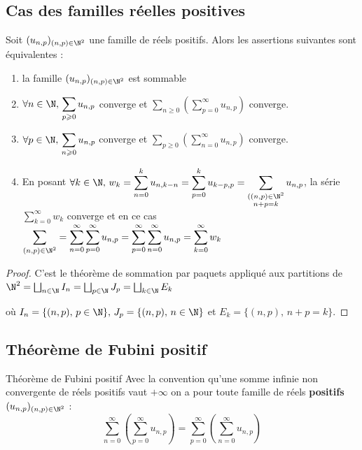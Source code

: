 \subsection{Cas des familles réelles positives}

\begin{theoreme}{}{}
    Soit $(u_{n, p})_{(n, p) \in \N^2}$ une famille de réels positifs.
    Alors les assertions suivantes sont équivalentes :
    \begin{enumerate}
        \item la famille $(u_{n, p})_{(n, p) \in \N^2}$ est sommable
        \item $\displaystyle \forall n \in \N, \, \sum_{p \geqslant 0 } u_{n, p}$ converge et $\displaystyle \sum_{n \geqslant 0} \left( \sum_{p = 0}^\infty u_{n, p} \right)$ converge.
        \item $\forall p \in \N, \, \displaystyle \sum_{n \geqslant 0 } u_{n, p}$ converge et $\displaystyle \sum_{p \geqslant 0} \left( \sum_{n = 0}^\infty u_{n, p} \right)$ converge.
        \item En posant $\forall k \in \N, \, w_k = \displaystyle \sum_{n = 0 }^{k }u_{n, k - n} = \sum_{p = 0 }^{k } u_{k - p, p} = \sum_{\substack{((n, p) \in \N^2 \\ n + p = k}} u_{n, p}$, la série $\displaystyle \sum_{k = 0}^\infty w_k$ converge
            et en ce cas $\displaystyle \sum_{(n, p) \in \N^2} = \sum_{n = 0 }^{\infty } \sum_{p = 0 }^{\infty }u_{n, p} = \sum_{p = 0 }^{\infty } \sum_{n = 0 }^{\infty }u_{n, p} = \sum_{k = 0 }^{\infty } w_k$ 
    \end{enumerate}
\end{theoreme}

\begin{proof}
    C'est le théorème de sommation par paquets appliqué aux partitions de
    $\N^2 = \bigsqcup_{n \in \N} I_n = \bigsqcup_{p \in \N} J_p = \bigsqcup_{k \in \N} E_k$

    où $I_n = \{ (n, p), \, p \in \N \}, \, J_p = \{ (n, p), \, n \in \N \}$ et
    $E_k = \{ (n, p), \, n + p = k \}$.
\end{proof}

\subsection{Théorème de Fubini positif }

\begin{theoreme}{Théorème de Fubini positif}{}
    Avec la convention qu'une somme infinie non convergente de réels positifs vaut 
    $+ \infty$ on a pour toute famille de réels \textbf{positifs} $(u_{n, p})_{(n, p) \in \N^2}$ :
    $$\sum_{n = 0}^\infty \left( \sum_{p = 0}^\infty u_{n, p} \right) = \sum_{p = 0}^\infty \left( \sum_{n = 0}^\infty u_{n, p} \right) $$
\end{theoreme}

